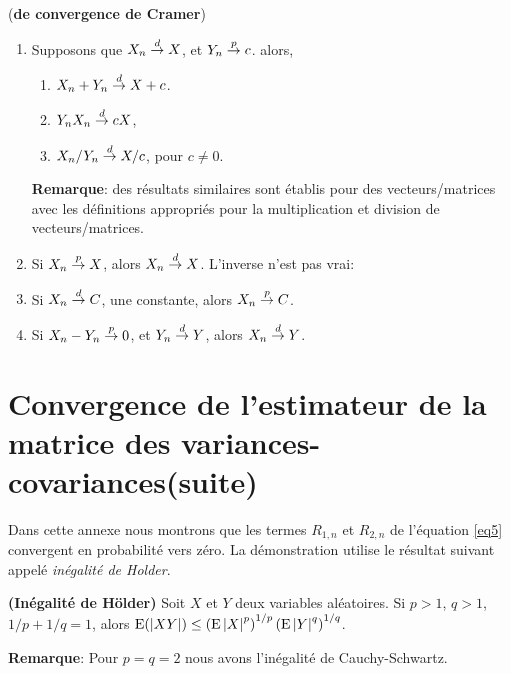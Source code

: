 \begin{theoreme}(\textbf{de convergence de Cramer})
    \begin{enumerate}[label = (\roman*)]
    \item Supposons que $X_n \overset{d}{\rightarrow} X$, et $Y_n \overset{p}{\rightarrow} c$. alors,
    \begin{enumerate}[label = (\alph*)]
        \item $X_n + Y_n \overset{d}{\rightarrow} X + c$.
        \item $Y_nX_n \overset{d}{\rightarrow} cX$,
        \item $X_n/Y_n \overset{d}{\rightarrow} X/c$, pour $c\neq 0$.
    \end{enumerate}
    \textbf{Remarque}: des résultats similaires sont établis pour des vecteurs/matrices avec 
les définitions appropriés pour la multiplication et division de vecteurs/matrices.
    \item  Si $X_n \overset{p}{\rightarrow} X$, alors $X_n \overset{d}{\rightarrow} X$. L'inverse n'est pas vrai:
    \item Si $X_n \overset{d}{\rightarrow} C$, une constante, alors $X_n \overset{p}{\rightarrow} C$.
    \item  Si $X_n - Y_n \overset{p}{\rightarrow} 0$, et $Y_n \overset{d}{\rightarrow} Y$, alors $X_n\overset{d}{\rightarrow} Y$.
    \end{enumerate}
\end{theoreme}
\newpage

\section{Convergence de l'estimateur de la matrice des variances-covariances(suite)}
Dans cette annexe nous montrons que les termes $R_{1,n}$ et $R_{2,n}$ de l'équation \eqref{eq5} convergent en probabilité vers zéro. La démonstration utilise le résultat suivant appelé \emph{inégalité de Holder}.
\begin{propriete}\textbf{(Inégalité de Hölder)} Soit $X$ et $Y$ deux variables aléatoires. Si $p>1$, $q>1$,  $1/p +1/q =1$,  alors $\operatorname{E}(\left\vert {XY} \right\vert) \leq \left(\operatorname{E}\left\vert {X} \right\vert^p\right)^{1/p}
\left(\operatorname{E}\left\vert {Y} \right\vert^q\right)^{1/q}$.
\end{propriete}
\textbf{Remarque}: Pour $p = q = 2$ nous avons l'inégalité de Cauchy-Schwartz.

